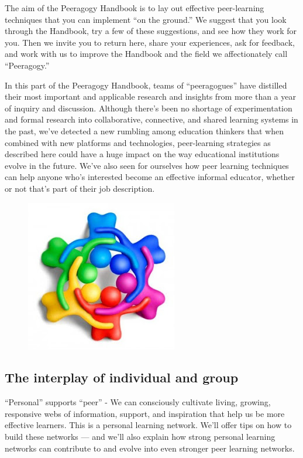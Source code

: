 The aim of the Peeragogy Handbook is to lay out effective peer-learning
techniques that you can implement ``on the ground.'' We suggest that you
look through the Handbook, try a few of these suggestions, and see how
they work for you. Then we invite you to return here, share your
experiences, ask for feedback, and work with us to improve the Handbook
and the field we affectionately call ``Peeragogy.''

In this part of the Peeragogy Handbook, teams of ``peeragogues'' have
distilled their most important and applicable research and insights from
more than a year of inquiry and discussion. Although there's been no
shortage of experimentation and formal research into collaborative,
connective, and shared learning systems in the past, we've detected a
new rumbling among education thinkers that when combined with new
platforms and technologies, peer-learning strategies as described here
could have a huge impact on the way educational institutions evolve in
the future. We've also seen for ourselves how peer learning techniques
can help anyone who's interested become an effective informal educator,
whether or not that's part of their job description.

\begin{figure}[htbp]
\centering
\includegraphics[width=.4\textwidth]{../pictures/peeragogy-in-action.jpg}
\end{figure}

\subsection{The interplay of individual and group}

``Personal'' supports ``peer'' - We can consciously cultivate living,
growing, responsive webs of information, support, and inspiration that
help us be more effective learners. This is a personal learning network.
We'll offer tips on how to build these networks --- and we'll also
explain how strong personal learning networks can contribute to and
evolve into even stronger peer learning networks.

